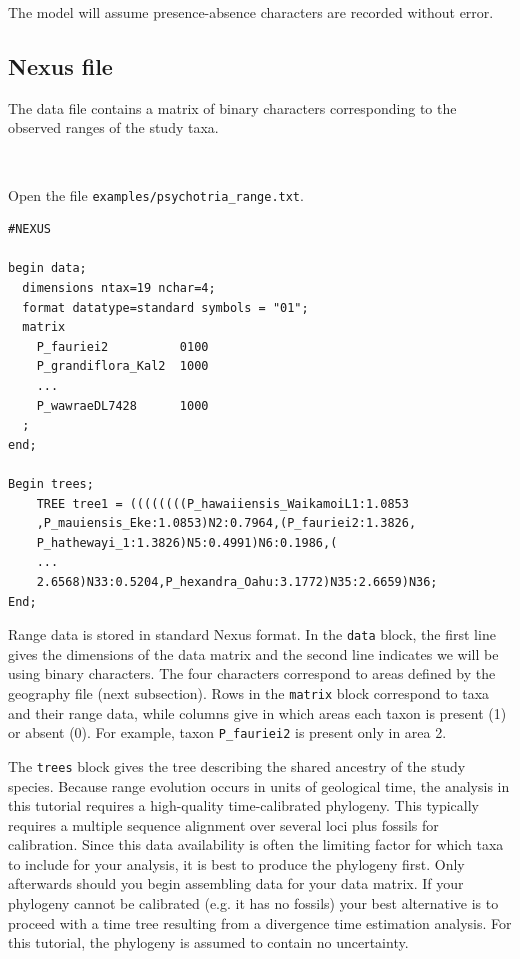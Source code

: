 \documentclass[11pt]{article}
\newcommand{\impmark}{\strut\vadjust{\domark}}
\newcommand{\domark}{%
  \vbox to 0pt{
    \kern-\dp\strutbox
    \smash{\llap{$\rightarrow$\kern1em}}
    \vss
  }%
}
\begin{document}
The model will assume presence-absence characters are recorded without error.

\subsection{Nexus file}

The data file contains a matrix of binary characters corresponding to the observed ranges of the study taxa.

\noindent \\ \impmark  Open the file \texttt{examples/psychotria\_range.txt}.

\begin{framed} \begin{lstlisting}
#NEXUS

begin data;
  dimensions ntax=19 nchar=4;
  format datatype=standard symbols = "01";
  matrix
    P_fauriei2          0100
    P_grandiflora_Kal2  1000
    ...
    P_wawraeDL7428      1000	
  ;
end;

Begin trees;
	TREE tree1 = ((((((((P_hawaiiensis_WaikamoiL1:1.0853
	,P_mauiensis_Eke:1.0853)N2:0.7964,(P_fauriei2:1.3826,
	P_hathewayi_1:1.3826)N5:0.4991)N6:0.1986,(
	...
	2.6568)N33:0.5204,P_hexandra_Oahu:3.1772)N35:2.6659)N36;
End;
\end{lstlisting}
\end{framed}

Range data is stored in standard Nexus format.
In the {\tt data} block, the first line gives the dimensions of the data matrix and the second line indicates we will be using binary characters.
The four characters correspond to areas defined by the geography file (next subsection).
Rows in the {\tt matrix} block correspond to taxa and their range data, while columns give in which areas each taxon is present (1) or absent (0).
For example, taxon {\tt P\_fauriei2} is present only in area 2.

The {\tt trees} block gives the tree describing the shared ancestry of the study species.
Because range evolution occurs in units of geological time, the analysis in this tutorial requires a high-quality time-calibrated phylogeny.
This typically requires a multiple sequence alignment over several loci plus fossils for calibration.
Since this data availability is often the limiting factor for which taxa to include for your analysis, it is best to produce the phylogeny first.
Only afterwards should you begin assembling data for your data matrix.
If your phylogeny cannot be calibrated (e.g. it has no fossils) your best alternative is to proceed with a time tree resulting from a divergence time estimation analysis.
For this tutorial, the phylogeny is assumed to contain no uncertainty.
\end{document}
